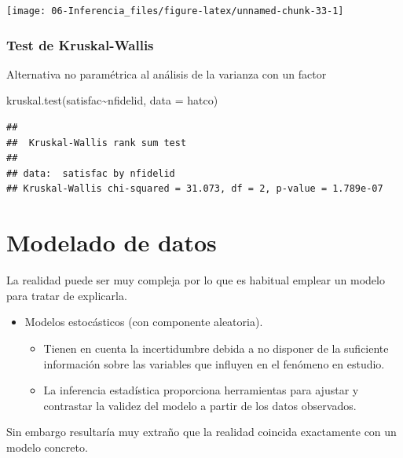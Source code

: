 \documentclass[
]{book}
\newenvironment{Shaded}{\begin{snugshade}}{\end{snugshade}}
\newcommand{\AttributeTok}[1]{\textcolor[rgb]{0.77,0.63,0.00}{#1}}
\newcommand{\FunctionTok}[1]{\textcolor[rgb]{0.00,0.00,0.00}{#1}}
\newcommand{\NormalTok}[1]{#1}
\newcommand{\SpecialCharTok}[1]{\textcolor[rgb]{0.00,0.00,0.00}{#1}}
\theoremstyle{break}
\begin{document}
\begin{center}\texttt{[image: 06-Inferencia\_files/figure-latex/unnamed-chunk-33-1]} \end{center}

\hypertarget{test-de-kruskal-wallis}{%
\subsection{Test de Kruskal-Wallis}\label{test-de-kruskal-wallis}}

Alternativa no paramétrica al análisis de la varianza con un factor

\begin{Shaded}
\begin{Highlighting}[]
\FunctionTok{kruskal.test}\NormalTok{(satisfac}\SpecialCharTok{\textasciitilde{}}\NormalTok{nfidelid, }\AttributeTok{data =}\NormalTok{ hatco)}
\end{Highlighting}
\end{Shaded}

\begin{verbatim}
## 
##  Kruskal-Wallis rank sum test
## 
## data:  satisfac by nfidelid
## Kruskal-Wallis chi-squared = 31.073, df = 2, p-value = 1.789e-07
\end{verbatim}

\hypertarget{modelado-de-datos}{%
\chapter{Modelado de datos}\label{modelado-de-datos}}

La realidad puede ser muy compleja por lo que es habitual emplear un
modelo para tratar de explicarla.

\begin{itemize}
\item
  Modelos estocásticos (con componente aleatoria).

  \begin{itemize}
  \item
    Tienen en cuenta la incertidumbre debida a no disponer de la suficiente información
    sobre las variables que influyen en el fenómeno en estudio.
  \item
    La inferencia estadística proporciona herramientas para ajustar y
    contrastar la validez del modelo a partir de los datos observados.
  \end{itemize}
\end{itemize}

Sin embargo resultaría muy extraño que la realidad coincida exactamente con un modelo concreto.
\end{document}
